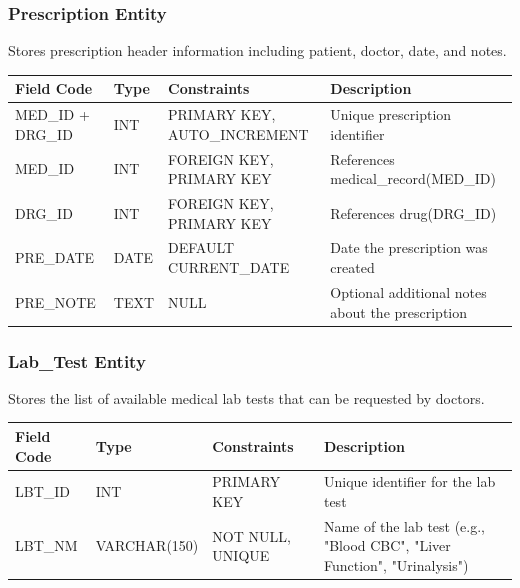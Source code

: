 \subsubsection{Prescription Entity}
Stores prescription header information including patient, doctor, date, and notes.

\begin{table}[H]
	\centering
	\small
	\renewcommand{\arraystretch}{1.3}
	\begin{tabularx}{\textwidth}{l l l X}
		\toprule
		\rowcolor[gray]{0.9} \textbf{Field Code} & \textbf{Type} & \textbf{Constraints} & \textbf{Description} \\
		\midrule
	 MED\_ID + DRG\_ID  & INT           & PRIMARY KEY, AUTO\_INCREMENT & Unique prescription identifier \\
		MED\_ID & INT & FOREIGN KEY, PRIMARY KEY & References medical\_record(MED\_ID) \\
		
		DRG\_ID & INT & FOREIGN KEY, PRIMARY KEY & References drug(DRG\_ID) \\
		
		PRE\_DATE   & DATE          & DEFAULT CURRENT\_DATE & Date the prescription was created \\
		PRE\_NOTE   & TEXT          & NULL & Optional additional notes about the prescription \\
		\bottomrule
	\end{tabularx}
\end{table}

\subsubsection{Lab\_Test Entity}
Stores the list of available medical lab tests that can be requested by doctors.

\begin{table}[H]
	\centering
	\small
	\renewcommand{\arraystretch}{1.3}
	\begin{tabularx}{\textwidth}{l l l X}
		\toprule
		\rowcolor[gray]{0.9} \textbf{Field Code} & \textbf{Type} & \textbf{Constraints} & \textbf{Description} \\
		\midrule
		LBT\_ID   & INT          & PRIMARY KEY & Unique identifier for the lab test \\
		LBT\_NM   & VARCHAR(150) & NOT NULL, UNIQUE            & Name of the lab test (e.g., "Blood CBC", "Liver Function", "Urinalysis") \\
		\bottomrule
	\end{tabularx}
\end{table}
